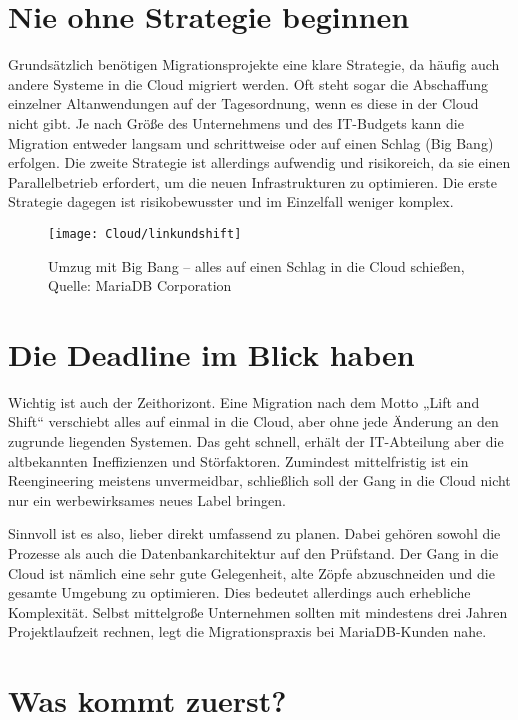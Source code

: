 \section{Nie ohne Strategie beginnen}

Grundsätzlich benötigen Migrationsprojekte eine klare Strategie, da häufig auch andere Systeme in die Cloud migriert werden. Oft steht sogar die Abschaffung einzelner Altanwendungen auf der Tagesordnung, wenn es diese in der Cloud nicht gibt. Je nach Größe des Unternehmens und des IT-Budgets kann die Migration entweder langsam und schrittweise oder auf einen Schlag (Big Bang) erfolgen. Die zweite Strategie ist allerdings aufwendig und risikoreich, da sie einen Parallelbetrieb erfordert, um die neuen Infrastrukturen zu optimieren. Die erste Strategie dagegen ist risikobewusster und im Einzelfall weniger komplex.

\begin{figure}
	\texttt{[image: Cloud/linkundshift]}
	\caption[Umzug mit Big Bang]{Umzug mit Big Bang -- alles auf einen Schlag in die Cloud schießen, Quelle: MariaDB Corporation}
\end{figure}


\section{Die Deadline im Blick haben}

Wichtig ist auch der Zeithorizont. Eine Migration nach dem Motto „Lift and Shift“ verschiebt alles auf einmal in die Cloud, aber ohne jede Änderung an den zugrunde liegenden Systemen. Das geht schnell, erhält der IT-Abteilung aber die altbekannten Ineffizienzen und Störfaktoren. Zumindest mittelfristig ist ein Reengineering meistens unvermeidbar, schließlich soll der Gang in die Cloud nicht nur ein werbewirksames neues Label bringen.

Sinnvoll ist es also, lieber direkt umfassend zu planen. Dabei gehören sowohl die Prozesse als auch die Datenbankarchitektur auf den Prüfstand. Der Gang in die Cloud ist nämlich eine sehr gute Gelegenheit, alte Zöpfe abzuschneiden und die gesamte Umgebung zu optimieren. Dies bedeutet allerdings auch erhebliche Komplexität. Selbst mittelgroße Unternehmen sollten mit mindestens drei Jahren Projektlaufzeit rechnen, legt die Migrationspraxis bei MariaDB-Kunden nahe.

\section{Was kommt zuerst?}

